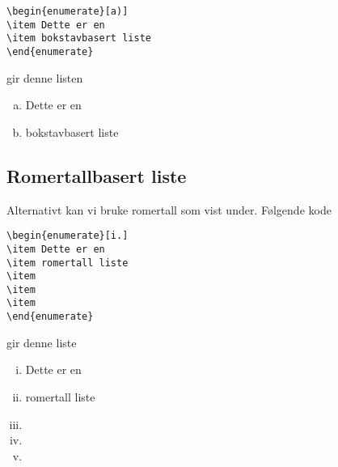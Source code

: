 \begin{boxedminipage}{\textwidth}
\begin{verbatim}
\begin{enumerate}[a)]
\item Dette er en 
\item bokstavbasert liste
\end{enumerate}
\end{verbatim}
\end{boxedminipage}

gir denne listen
\begin{enumerate}[a)]
\item Dette er en 
\item bokstavbasert liste
\end{enumerate}

\subsection{Romertallbasert liste}
Alternativt kan vi bruke romertall som vist under.
Følgende kode

\begin{boxedminipage}{\textwidth}
\begin{verbatim}
\begin{enumerate}[i.]
\item Dette er en 
\item romertall liste
\item 
\item 
\item 
\end{enumerate}
\end{verbatim}
\end{boxedminipage}

gir denne liste
\begin{enumerate}[i.]
\item Dette er en 
\item romertall liste
\item 
\item 
\item 
\end{enumerate}


